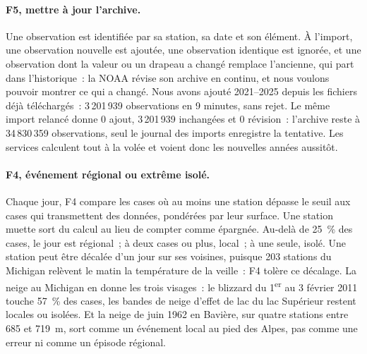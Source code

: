 \paragraph{F5, mettre à jour l'archive.} Une observation est identifiée par sa station, sa date et son élément. À l'import, une observation nouvelle est ajoutée, une observation identique est ignorée, et une observation dont la valeur ou un drapeau a changé remplace l'ancienne, qui part dans l'historique~: la NOAA révise son archive en continu, et nous voulons pouvoir montrer ce qui a changé. Nous avons ajouté 2021--2025 depuis les fichiers déjà téléchargés~: 3\,201\,939 observations en 9 minutes, sans rejet. Le même import relancé donne 0 ajout, 3\,201\,939 inchangées et 0 révision~: l'archive reste à 34\,830\,359 observations, seul le journal des imports enregistre la tentative. Les services calculent tout à la volée et voient donc les nouvelles années aussitôt.

\paragraph{F4, événement régional ou extrême isolé.} Chaque jour, F4 compare les cases où au moins une station dépasse le seuil aux cases qui transmettent des données, pondérées par leur surface. Une station muette sort du calcul au lieu de compter comme épargnée. Au-delà de 25~\% des cases, le jour est régional~; à deux cases ou plus, local~; à une seule, isolé. Une station peut être décalée d'un jour sur ses voisines, puisque 203 stations du Michigan relèvent le matin la température de la veille~: F4 tolère ce décalage. La neige au Michigan en donne les trois visages~: le blizzard du 1\textsuperscript{er} au 3 février 2011 touche 57~\% des cases, les bandes de neige d'effet de lac du lac Supérieur restent locales ou isolées. Et la neige de juin 1962 en Bavière, sur quatre stations entre 685 et 719~m, sort comme un événement local au pied des Alpes, pas comme une erreur ni comme un épisode régional.
